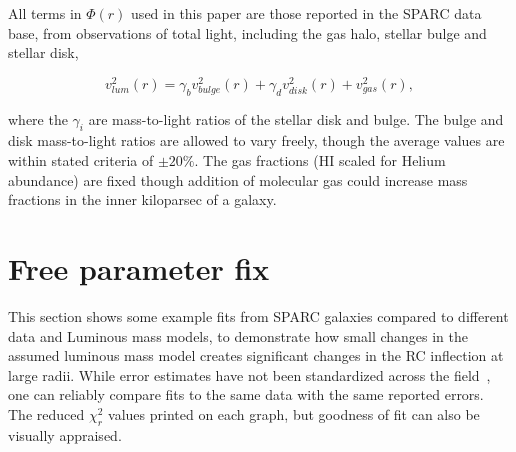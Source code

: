 \documentclass[reprint,%
 amsmath,amssymb,
 aps,
]{revtex4-1}
\begin{document}
 

 All terms in $\Phi(r)$ used in this paper  are   those reported in   the SPARC data base, from observations of total light, including the gas halo, stellar bulge and  stellar disk, 
 
  \begin{equation}
v_{lum}^2 (r)= \gamma_b v_{bulge}^2(r) +  \gamma_d v_{disk}^2(r) + v_{gas}^2(r),  
\label{eq:zonte3}
\end{equation} 
 
where the  $\gamma_i$  are  mass-to-light ratios of the stellar disk and bulge.   The    bulge and disk mass-to-light ratios are allowed to vary freely, though the average values are within stated criteria   \cite{2016Lelli} of $\pm 20\%$. The gas fractions (HI scaled for Helium abundance) are fixed though addition of molecular gas could increase mass fractions in the inner kiloparsec of a galaxy. 



 

 
\section{Free parameter fix }
 


This section shows some example fits from SPARC galaxies compared to different data and  Luminous mass models, to demonstrate how small changes in the   assumed  luminous mass model creates significant changes in the RC inflection at large radii. 
While error    estimates have not been standardized across the field~\citep{Blok,Gent,Toky},     one can reliably   compare fits to the same data with the same reported errors. The     reduced $\chi^2_r$ values printed on each graph, but goodness of fit can also be visually appraised.  
 
\end{document}
